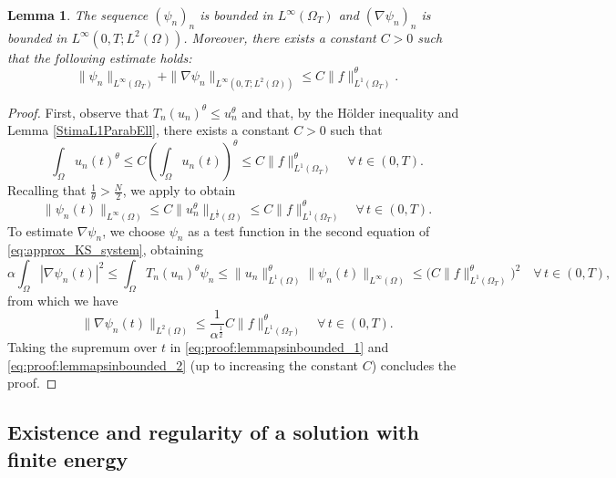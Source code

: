 \documentclass{amsart}
\numberwithin{equation}{section}
\newtheorem{lemma}[example]{Lemma}
\def\elle#1{L^{#1}}
\def\elleom#1{L^{#1}(\Omega)}
\def\io{\int_\Omega}
\def\norma#1#2{ \|#1 \|_{#2}}
\newcommand{\abs}[1]{\left|#1\right|}
\begin{document}
\begin{lemma}\label{lemma:psin_bounded_unif}
    The sequence $(\psi_n)_n$ is bounded in $\elle\infty(\Omega_T)$ and $(\nabla\psi_n)_n$ is bounded in $\elle\infty(0,T;\elleom2)$. Moreover, there exists a constant $C>0$ such that the following estimate holds:
    \begin{equation}\label{eq:lemma:psin_bounded_unif}
        \norma{\psi_n}{\elle\infty(\Omega_T)}+\norma{\nabla \psi_n}{\elle\infty(0,T;\elleom2)}\leq C\norma{f}{\elle1(\Omega_T)}^\theta.
    \end{equation}
\end{lemma}
\begin{proof}
    First, observe that $T_n(u_n)^\theta\leq u_n^\theta$ and that, by the H\"older inequality and Lemma \ref{StimaL1ParabEll}, there exists a constant $C>0$ such that
    $$\io u_n(t)^\theta\leq C\left(\io u_n(t)\right)^\theta\leq C\norma{f}{\elle1(\Omega_T)}^\theta \quad\forall\,t\in(0,T).$$
    Recalling that $\frac1\theta>\frac{N}{2}$, we apply \cite[Th\'eor\`eme 4.1]{StampacchiaElliptic} to obtain
    \begin{equation}\label{eq:proof:lemmapsinbounded_1}
        \norma{\psi_n(t)}{\elleom\infty}\leq C\norma{u_n^\theta}{\elleom{\frac{1}{\theta}}}\leq C\norma{f}{\elle1(\Omega_T)}^\theta \quad\forall\,t\in(0,T).
    \end{equation}
    To estimate $\nabla\psi_n$, we choose $\psi_n$ as a test function in the second equation of \eqref{eq:approx_KS_system}, obtaining
    $$
    \alpha\io\abs{\nabla\psi_n(t)}^2
    \leq\io T_n(u_n)^\theta\psi_n
    \leq
    \norma{u_n}{\elleom1}^\theta\norma{\psi_n(t)}{\elleom\infty}\leq \bigr(C\norma{f}{\elle1(\Omega_T)}^\theta)^2\quad\forall\,t\in(0,T),
    $$
    from which we have
    \begin{equation}\label{eq:proof:lemmapsinbounded_2}
    \norma{\nabla\psi_n(t)}{\elleom2}\leq \frac{1}{\alpha^{\frac12}}C\norma{f}{\elle1(\Omega_T)}^\theta\quad\forall\,t\in(0,T).        
    \end{equation}
    Taking the supremum over $t$ in \eqref{eq:proof:lemmapsinbounded_1} and \eqref{eq:proof:lemmapsinbounded_2} (up to increasing the constant $C$) concludes the proof.
\end{proof}

\subsection{Existence and regularity of a solution with finite energy}\label{sec:highsummability}
\end{document}
